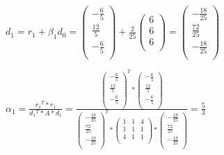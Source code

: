 \documentclass[10pt,DIV10,a4paper]{scrartcl}
\begin{document}
\(d_1= r_1+\beta _1d_0=  \left(
\begin{array}{c}
 -\frac{6}{5} \\
 \frac{12}{5} \\
 -\frac{6}{5} \\
\end{array}
\right) + \frac{2}{25}\left(
\begin{array}{c}
 6 \\
 6 \\
 6 \\
\end{array}
\right)=\left(
\begin{array}{c}
 -\frac{18}{25} \\
 \frac{72}{25} \\
 -\frac{18}{25} \\
\end{array}
\right)\)

\(\alpha _1=\frac{r_1{}^T* r_1}{d_1{}^T* A * d_1}=\frac{\left(
\begin{array}{c}
 -\frac{6}{5} \\
 \frac{12}{5} \\
 -\frac{6}{5} \\
\end{array}
\right)^T* \left(
\begin{array}{c}
 -\frac{6}{5} \\
 \frac{12}{5} \\
 -\frac{6}{5} \\
\end{array}
\right)}{\left(
\begin{array}{c}
 -\frac{18}{25} \\
 \frac{72}{25} \\
 -\frac{18}{25} \\
\end{array}
\right)^T* \left(
\begin{array}{ccc}
 1 & 1 & 4 \\
 1 & 1 & 1 \\
 4 & 1 & 1 \\
\end{array}
\right) *\left(
\begin{array}{c}
 -\frac{18}{25} \\
 \frac{72}{25} \\
 -\frac{18}{25} \\
\end{array}
\right)}= \frac{5}{3}\)
\end{document}
